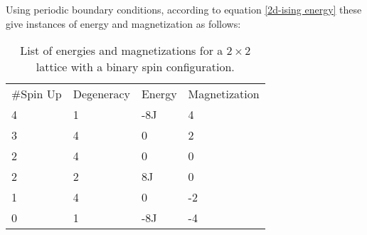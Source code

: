 \documentclass[10pt,a4paper]{article}
\begin{document}
Using periodic boundary conditions, according to equation \eqref{2d-ising energy} these give instances of energy and magnetization as follows:
\begin{table}[H]
\caption[energies and magnetizations for a $2\times2$ lattice]{List of energies and magnetizations for a $2\times2$ lattice with a binary spin configuration.}
\begin{tabular}{llll}
\#Spin Up & Degeneracy & Energy & Magnetization \\
4         & 1          & -8J    & 4             \\
3         & 4          & 0      & 2             \\
2         & 4          & 0      & 0             \\
2         & 2          & 8J     & 0             \\
1         & 4          & 0      & -2            \\
0         & 1          & -8J    & -4           
\end{tabular}
\label{energies and magnetizations for a 2x2 lattice}
\end{table}
\end{document}
